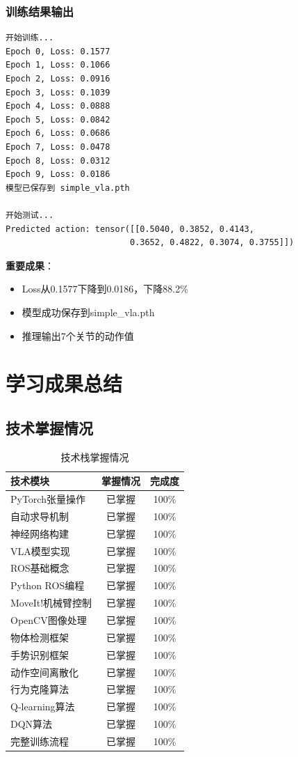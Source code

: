 \documentclass[12pt,a4paper]{article}
\begin{document}
\subsubsection{训练结果输出}

\begin{verbatim}
开始训练...
Epoch 0, Loss: 0.1577
Epoch 1, Loss: 0.1066
Epoch 2, Loss: 0.0916
Epoch 3, Loss: 0.1039
Epoch 4, Loss: 0.0888
Epoch 5, Loss: 0.0842
Epoch 6, Loss: 0.0686
Epoch 7, Loss: 0.0478
Epoch 8, Loss: 0.0312
Epoch 9, Loss: 0.0186
模型已保存到 simple_vla.pth

开始测试...
Predicted action: tensor([[0.5040, 0.3852, 0.4143, 
                         0.3652, 0.4822, 0.3074, 0.3755]])
\end{verbatim}

\textbf{重要成果}：
\begin{itemize}
    \item Loss从0.1577下降到0.0186，下降88.2\%
    \item 模型成功保存到simple\_vla.pth
    \item 推理输出7个关节的动作值
\end{itemize}

\section{学习成果总结}

\subsection{技术掌握情况}

\begin{table}[h]
\centering
\caption{技术栈掌握情况}
\begin{tabular}{lcc}
\toprule
技术模块 & 掌握情况 & 完成度 \\
\midrule
PyTorch张量操作 & 已掌握 & 100\% \\
自动求导机制 & 已掌握 & 100\% \\
神经网络构建 & 已掌握 & 100\% \\
VLA模型实现 & 已掌握 & 100\% \\
ROS基础概念 & 已掌握 & 100\% \\
Python ROS编程 & 已掌握 & 100\% \\
MoveIt!机械臂控制 & 已掌握 & 100\% \\
OpenCV图像处理 & 已掌握 & 100\% \\
物体检测框架 & 已掌握 & 100\% \\
手势识别框架 & 已掌握 & 100\% \\
动作空间离散化 & 已掌握 & 100\% \\
行为克隆算法 & 已掌握 & 100\% \\
Q-learning算法 & 已掌握 & 100\% \\
DQN算法 & 已掌握 & 100\% \\
完整训练流程 & 已掌握 & 100\% \\
\bottomrule
\end{tabular}
\end{table}
\end{document}
